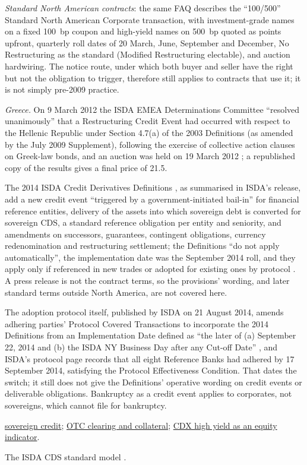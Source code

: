 \begin{qfmechanism}
\emph{Standard North American contracts}: the same FAQ describes the ``100/500'' Standard North American Corporate transaction, with investment-grade names on a fixed 100~bp coupon and high-yield names on 500~bp quoted as points upfront, quarterly roll dates of 20 March, June, September and December, No Restructuring as the standard (Modified Restructuring electable), and auction hardwiring. The notice route, under which both buyer and seller have the right but not the obligation to trigger, therefore still applies to contracts that use it; it is not simply pre-2009 practice.

\emph{Greece.} On 9 March 2012 the ISDA EMEA Determinations Committee ``resolved unanimously'' that a Restructuring Credit Event had occurred with respect to the Hellenic Republic under Section 4.7(a) of the 2003 Definitions (as amended by the July 2009 Supplement), following the exercise of collective action clauses on Greek-law bonds, and an auction was held on 19 March 2012 \citep[releases of 9 and 19 March 2012]{isda-greece-2012}; a republished copy of the results gives a final price of 21.5.

The 2014 ISDA Credit Derivatives Definitions \citep[catalogue entry]{add-cds-contract}, as summarised in ISDA's release, add a new credit event ``triggered by a government-initiated bail-in'' for financial reference entities, delivery of the assets into which sovereign debt is converted for sovereign CDS, a standard reference obligation per entity and seniority, and amendments on successors, guarantees, contingent obligations, currency redenomination and restructuring settlement; the Definitions ``do not apply automatically'', the implementation date was the September 2014 roll, and they apply only if referenced in new trades or adopted for existing ones by protocol \citep[pp.~1--2]{isda-2014-release}. A press release is not the contract terms, so the provisions' wording, and later standard terms outside North America, are not covered here.

The adoption protocol itself, published by ISDA on 21 August 2014, amends adhering parties' Protocol Covered Transactions to incorporate the 2014 Definitions from an Implementation Date defined as ``the later of (a) September 22, 2014 and (b) the ISDA NY Business Day after any Cut-off Date'' \citep[PDF pp.~1 and~13]{isda-2014-protocol}, and ISDA's protocol page records that all eight Reference Banks had adhered by 17 September 2014, satisfying the Protocol Effectiveness Condition. That dates the switch; it still does not give the Definitions' operative wording on credit events or deliverable obligations. Bankruptcy as a credit event applies to corporates, not sovereigns, which cannot file for bankruptcy.

 \hyperref[def:sovereign-credit-defaults]{sovereign credit}; \hyperref[mech:otc-clearing-collateral]{OTC clearing and collateral}; \hyperref[meth:equity-macro-leading-indicators]{CDX high yield as an equity indicator}.

 The ISDA CDS standard model \citep{add-cds-model}.

\end{qfmechanism}

